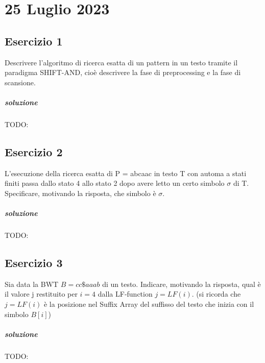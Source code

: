 \chapter{25 Luglio 2023}

\section{Esercizio 1}

Descrivere l'algoritmo di ricerca esatta di un pattern in un testo tramite il paradigma SHIFT-AND, cio\`e descrivere la fase di preprocessing e la fase di scansione.

\paragraph{soluzione} TODO:

\section{Esercizio 2}

L'esecuzione della ricerca esatta di P = abcaac in testo T con automa a stati finiti passa dallo stato 4 allo stato 2 dopo avere letto un certo simbolo $\sigma$ di T.
Specificare, motivando la risposta, che simbolo \`e $\sigma$.

\paragraph{soluzione} TODO:

\section{Esercizio 3}

Sia data la BWT $B = cc\$aaab$ di un testo. Indicare, motivando la risposta, qual \`e il valore j restituito per $i = 4$ dalla LF-function $j = LF(i)$.
(si ricorda che $j = LF(i)$ \`e la posizione nel Suffix Array del suffisso del testo che inizia con il simbolo $B[i]$)

\paragraph{soluzione} TODO:
